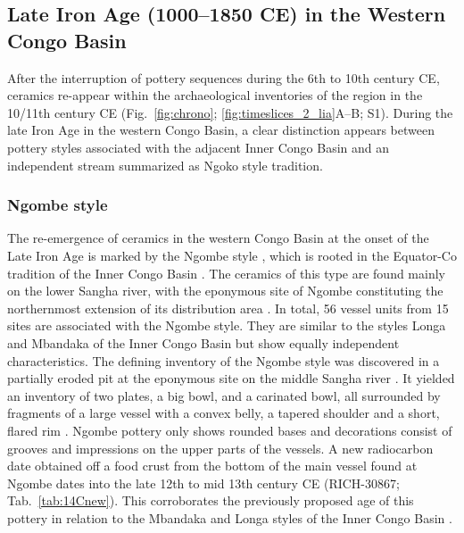 \documentclass[smallextended,natbib]{svjour3}       %
\begin{document}
\subsection*{Late Iron Age (1000--1850 CE) in the Western Congo Basin}

After the interruption of pottery sequences during the 6th to 10th century CE, ceramics re-appear within the archaeological inventories of the region in the 10/11th century CE (Fig.~\ref{fig:chrono}; \ref{fig:timeslices_2_lia}A--B; S1). During the late Iron Age in the western Congo Basin, a clear distinction appears between pottery styles associated with the adjacent Inner Congo Basin and an independent stream summarized as Ngoko style tradition.

\subsubsection*{Ngombe style}

The re-emergence of ceramics in the western Congo Basin at the onset of the Late Iron Age is marked by the Ngombe style \citep[125--128]{Seidensticker.2021e}, which is rooted in the Equator-Co tradition of the Inner Congo Basin \citep[222 Fig. 4]{Wotzka.1995}. The ceramics of this type are found mainly on the lower Sangha river, with the eponymous site of Ngombe constituting the northernmost extension of its distribution area \citep[127 Fig. 54]{Seidensticker.2021e}. In total, 56 vessel units from 15 sites are associated with the Ngombe style. They are similar to the styles Longa and Mbandaka \citep[121--128, 139--143]{Wotzka.1995} of the Inner Congo Basin but show equally independent characteristics. The defining inventory of the Ngombe style was discovered in a partially eroded pit at the eponymous site on the middle Sangha river \citep[305--306]{Seidensticker.2021e}. It yielded an inventory of two plates, a big bowl, and a carinated bowl, all surrounded by fragments of a large vessel with a convex belly, a tapered shoulder and a short, flared rim \citep[Fig.~\ref{fig:sangha}.10--12;][Pl. 42.15--44.2]{Seidensticker.2021e}. Ngombe pottery only shows rounded bases and decorations consist of grooves and impressions on the upper parts of the vessels. A new radiocarbon date obtained off a food crust from the bottom of the main vessel found at Ngombe dates into the late 12th to mid 13th century CE (RICH-30867; Tab.~\ref{tab:14Cnew}). This corroborates the previously proposed age of this pottery in relation to the Mbandaka and Longa styles of the Inner Congo Basin \citep[Fig.~\ref{fig:chrono}; \ref{fig:timeslices_2_lia}B--C; S1; Tab.~S1;][126--128]{Seidensticker.2021e}. 
\end{document}
